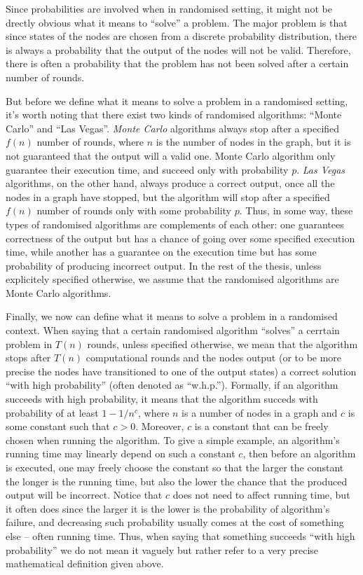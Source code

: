 Since probabilities are involved when in randomised setting, it might not be
drectly obvious what it means to ``solve'' a problem. The major problem is that
since states of the nodes are chosen from a discrete probability distribution,
there is always a probability that the output of the nodes will not be valid.
Therefore, there is often a probability that the problem has not been solved
after a certain number of rounds.

But before we define what it means to solve a problem in a randomised setting, it's
worth noting that there exist two kinds of randomised algorithms: ``Monte Carlo'' and
``Las Vegas''. \emph{Monte Carlo} algorithms always stop after a specified $f(n)$
number of rounds, where $n$ is the number of nodes in the graph, but
it is not guaranteed that the output will a valid one. Monte Carlo algorithm
only guarantee their execution time, and succeed only with probability $p$.
\emph{Las Vegas} algorithms, on the other hand, always produce a correct output,
once all the nodes in a graph have stopped, but the algorithm will stop after a
specified $f(n)$ number of rounds only with some probability $p$. Thus, in some
way, these types of randomised algorithms are complements of each other:
one guarantees correctness of the output but has a chance of going over some
specified execution time, while another has a guarantee on the execution time
but has some probability of producing incorrect output. In the rest of the thesis,
unless explicitely specified otherwise, we assume that the randomised algorithms
are Monte Carlo algorithms.

Finally, we now can define what it means to solve a problem in a randomised context.
When saying that a certain randomised algorithm ``solves'' a cerrtain problem in
$T(n)$ rounds, unless specified otherwise, we mean that the algorithm stops after
$T(n)$ computational rounds and the nodes output (or to be more precise the nodes
have transitioned to one of the output states) a correct solution ``with high
probability'' (often denoted as ``w.h.p.''). Formally, if an algorithm succeeds with
high probability, it means that the algorithm succeds with probability of at least
$1 - 1 / n^c$, where $n$ is a number of nodes in a graph and $c$ is some constant
such that $c > 0$. Moreover, $c$ is a constant that can be freely chosen when 
running the algorithm. To give a simple example, an algorithm's running time may
linearly depend on such a constant $c$, then before an algorithm is executed,
one may freely choose the constant so that the larger the constant the longer is
the running time, but also the lower the chance that the produced output will
be incorrect. Notice that $c$ does not need to affect running time, but it often
does since the larger it is the lower is the probability of algorithm's failure,
and decreasing such probability usually comes at the cost of something else -- 
often running time. Thus, when saying that something succeeds ``with high probability''
we do not mean it vaguely but rather refer to a very precise mathematical definition
given above.


